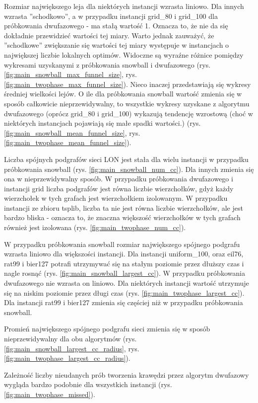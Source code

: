 Rozmiar największego leja dla niektórych instancji wzrasta liniowo. Dla innych wzrasta ''schodkowo'', a w przypadku instancji grid\_80 i grid\_100 dla
próbkowania dwufazowego - ma stałą wartość 1. Oznacza to, że nie da się dokładnie przewidzieć wartości tej miary. Warto jednak zauważyć, że
''schodkowe'' zwiększanie się wartości tej miary występuje w instancjach o największej liczbie lokalnych optimów.
Widoczne są wyraźne różnice pomiędzy wykresami uzyskanymi z próbkowania snowball i dwufazowego (rys. \ref{fig:main_snowball_max_funnel_size}, rys. \ref{fig:main_twophase_max_funnel_size}).
Nieco inaczej przedstawiają się wykresy średniej wielkości lejów. O ile dla próbkowania snowball wartość zmienia się w sposób całkowicie nieprzewidywalny,
to wszystkie wykresy uzyskane z algorytmu dwufazowego (oprócz grid\_80 i grid\_100) wykazują tendencję wzrostową (choć w niektórych instancjach pojawiają się małe spadki wartości.)
(rys. \ref{fig:main_snowball_mean_funnel_size}, rys. \ref{fig:main_twophase_mean_funnel_size}).

Liczba spójnych podgrafów sieci LON jest stała dla wielu instancji w przypadku próbkowania snowball (rys. \ref{fig:main_snowball_num_cc}). Dla innych zmienia się ona w nieprzewidywalny sposób.
W przypadku próbkowania dwufazowego i instancji grid liczba podgrafów jest równa liczbie wierzchołków, gdyż każdy wierzchołek w tych grafach jest wierzchołkiem izolowanym.
W przypadku instancji ze zbioru tsplib, liczba ta nie jest równa liczbie wierzchołków, ale jest bardzo bliska - oznacza to, że znaczna większość
wierzchołków w tych grafach również jest izolowana (rys. \ref{fig:main_twophase_num_cc}).

W przypadku próbkowania snowball rozmiar największego spójnego podgrafu wzrasta liniowo dla większości instancji. Dla instancji uniform\_100, oraz
eil76, rat99 i bier127 potrafi utrzymywać się na stałym poziomie przez dłuższy czas i nagle rosnąć (rys. \ref{fig:main_snowball_largest_cc}).
W przypadku próbkowania dwufazowego nie wzrasta on liniowo. Dla niektórych instancji wartość utrzymuje się na niskim poziomie przez długi czas (rys. \ref{fig:main_twophase_largest_cc}).
Dla instancji rat99 i bier127 zmienia się częściej niż w przypadku próbkowania snowball.

Promień największego spójnego podgrafu sieci zmienia się w sposób nieprzewidywalny dla obu algorytmów (rys. \ref{fig:main_snowball_largest_cc_radius}, rys. \ref{fig:main_twophase_largest_cc_radius}).

Zależność liczby nieudanych prób tworzenia krawędzi przez algorytm dwufazowy wygląda bardzo podobnie dla wszystkich instancji (rys. \ref{fig:main_twophase_missed}).

